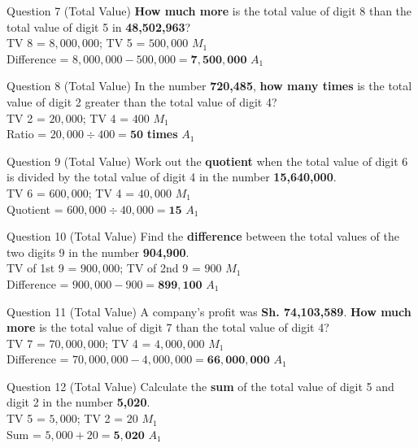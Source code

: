 \documentclass[12pt, a4paper, oneside]{article}
\begin{document}
\begin{solvingbox}{Question 7 (Total Value)}
\textbf{How much more} is the total value of digit 8 than the total value of digit 5 in \textbf{48,502,963}? \\
TV 8 = $8,000,000$; TV 5 = $500,000$ \hfill $M_1$ \\
Difference = $8,000,000 - 500,000 = \mathbf{7,500,000}$ \hfill $A_1$
\end{solvingbox}

\begin{solvingbox}{Question 8 (Total Value)}
In the number \textbf{720,485}, \textbf{how many times} is the total value of digit 2 greater than the total value of digit 4? \\
TV 2 = $20,000$; TV 4 = $400$ \hfill $M_1$ \\
Ratio = $20,000 \div 400 = \mathbf{50}$ \textbf{times} \hfill $A_1$
\end{solvingbox}

\begin{solvingbox}{Question 9 (Total Value)}
Work out the \textbf{quotient} when the total value of digit 6 is divided by the total value of digit 4 in the number \textbf{15,640,000}. \\
TV 6 = $600,000$; TV 4 = $40,000$ \hfill $M_1$ \\
Quotient = $600,000 \div 40,000 = \mathbf{15}$ \hfill $A_1$
\end{solvingbox}

\begin{solvingbox}{Question 10 (Total Value)}
Find the \textbf{difference} between the total values of the two digits 9 in the number \textbf{904,900}. \\
TV of 1st 9 = $900,000$; TV of 2nd 9 = $900$ \hfill $M_1$ \\
Difference = $900,000 - 900 = \mathbf{899,100}$ \hfill $A_1$
\end{solvingbox}

\begin{solvingbox}{Question 11 (Total Value)}
A company's profit was \textbf{Sh. 74,103,589}. \textbf{How much more} is the total value of digit 7 than the total value of digit 4? \\
TV 7 = $70,000,000$; TV 4 = $4,000,000$ \hfill $M_1$ \\
Difference = $70,000,000 - 4,000,000 = \mathbf{66,000,000}$ \hfill $A_1$
\end{solvingbox}

\begin{solvingbox}{Question 12 (Total Value)}
Calculate the \textbf{sum} of the total value of digit 5 and digit 2 in the number \textbf{5,020}. \\
TV 5 = $5,000$; TV 2 = $20$ \hfill $M_1$ \\
Sum = $5,000 + 20 = \mathbf{5,020}$ \hfill $A_1$
\end{solvingbox}
\end{document}
